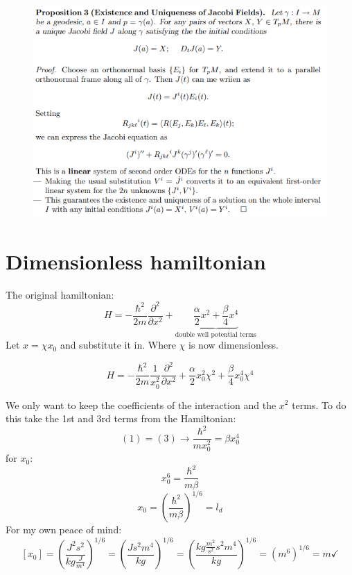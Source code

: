 \documentclass[12pt,a4paper]{article}
\numberwithin{equation}{section}
\begin{document}
\begin{figure}[H]
\centering
\includegraphics[width = 1\textwidth]{poof}
\end{figure}
{\color{red}{Tehát ha, az I intervallumom a $[-T,T]$ és ebből kiveszek egy tetszőleges pontot, legyen az $-T$, akkor bármilyen 2 kezdőfeltétellel megoldását kapjuk a a Jacobi egyenletnek?}}

\newpage
\section{Dimensionless hamiltonian}

The original hamiltonian:
\begin{equation}
H = -\frac{\hbar^2}{2m} \frac{\partial^2}{\partial x^2} + \underbrace{\frac{\alpha}{2}x^2 + \frac{\beta}{4}x^4}_{\text{double well potential terms}}
\end{equation}
Let $x = \chi x_0$ and substitute it in. Where $\chi$ is now dimensionless.

\begin{equation}
H = -\frac{\hbar^2}{2m} \frac{1}{x_0 ^2} \frac{\partial^2}{\partial x^2} + \frac{\alpha}{2}x_0 ^2 \chi^2 + \frac{\beta}{4}x_0^4 \chi^4
\end{equation}

We only want to keep the coefficients of the interaction and the $x^2$ terms. To do this take the 1st and 3rd terms from the Hamiltonian:
\begin{equation}\label{eq1}
(1) = (3) \rightarrow \frac{\hbar^2}{m x_0 ^2} = \beta x_0 ^4 
\end{equation}
for $x_0$:
$$
x_0 ^6 = \frac{\hbar^2}{m \beta}
$$
\begin{equation}
x_0 = \left( \frac{\hbar^2}{m \beta} \right)^{1/6} = l_d
\end{equation}
For my own peace of mind:
\[
[x_0] = \left( \frac{J^2 s^2}{kg \frac{J}{m^4}} \right)^{1/6} = \left( \frac{J s^2 m^4}{kg} \right)^{1/6}  = \left( \frac{kg \frac{m^2}{s^2} s^2 m^4}{kg} \right)^{1/6} = (m^6)^{1/6} = m \checkmark
\] 
\end{document}
